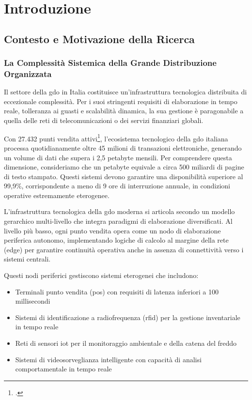 \chapter{\texorpdfstring{\textbf{Introduzione}}{Capitolo 1 - Introduzione}}
\label{cap:introduzione}

\section{\texorpdfstring{\textbf{Contesto e Motivazione della Ricerca}}{1.1 - Contesto e Motivazione della Ricerca}}
\label{sec:contesto_motivazione}

\subsection{\texorpdfstring{\textbf{La Complessità Sistemica della Grande Distribuzione Organizzata}}{1.1.1 - La Complessità Sistemica della Grande Distribuzione Organizzata}}
\label{subsec:complessita_sistemica}

Il settore della \gls{gdo} in Italia costituisce un'infrastruttura tecnologica distribuita di eccezionale complessità. Per i suoi stringenti requisiti di elaborazione in tempo reale, tolleranza ai guasti e scalabilità dinamica, la sua gestione è paragonabile a quella delle reti di telecomunicazioni o dei servizi finanziari globali.

Con 27.432 punti vendita attivi\footcite{istat2024}, l'ecosistema tecnologico della \gls{gdo} italiana processa quotidianamente oltre 45 milioni di transazioni elettroniche, generando un volume di dati che supera i 2,5 petabyte mensili. Per comprendere questa dimensione, consideriamo che un petabyte equivale a circa 500 miliardi di pagine di testo stampato. Questi sistemi devono garantire una disponibilità superiore al 99,9\%, corrispondente a meno di 9 ore di interruzione annuale, in condizioni operative estremamente eterogenee.

L'infrastruttura tecnologica della \gls{gdo} moderna si articola secondo un modello gerarchico multi-livello che integra paradigmi di elaborazione diversificati. Al livello più basso, ogni punto vendita opera come un nodo di elaborazione periferica autonomo, implementando logiche di calcolo al margine della rete (\gls{edge}) per garantire continuità operativa anche in assenza di connettività verso i sistemi centrali. 

Questi nodi periferici gestiscono sistemi eterogenei che includono:
\begin{itemize}
\item Terminali punto vendita (\gls{pos}) con requisiti di latenza inferiori a 100 millisecondi
\item Sistemi di identificazione a radiofrequenza (\gls{rfid}) per la gestione inventariale in tempo reale
\item Reti di sensori \gls{iot} per il monitoraggio ambientale e della catena del freddo
\item Sistemi di videosorveglianza intelligente con capacità di analisi comportamentale in tempo reale
\end{itemize}

